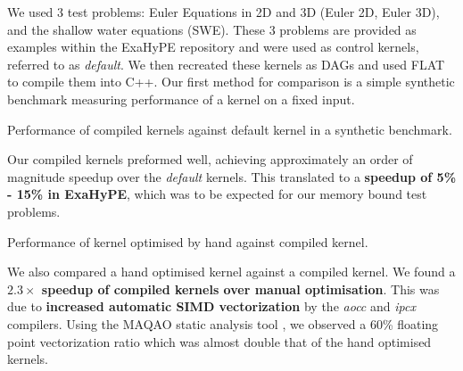 We used 3 test problems: Euler Equations in 2D and 3D (Euler 2D, Euler 3D), and the shallow water equations (SWE).
These 3 problems are provided as examples within the ExaHyPE repository and were used as control kernels, referred to as \textit{default}.
We then recreated these kernels as DAGs and used FLAT to compile them into C++.
Our first method for comparison is a simple synthetic benchmark measuring performance of a kernel on a fixed input.  

\begin{table}
    \centering
     
    \caption{Performance of compiled kernels against default kernel in a synthetic benchmark.} 
\end{table}

Our compiled kernels preformed well, achieving approximately an order of magnitude speedup over the \textit{default} kernels.
This translated to a \textbf{speedup of 5\% - 15\% in ExaHyPE}, which was to be expected for our memory bound test problems.


\begin{table}
    \centering
     
    \caption{Performance of kernel optimised by hand against compiled kernel.}
\end{table}
We also compared a hand optimised kernel against a compiled kernel. 
We found a \textbf{$2.3\times$ speedup of compiled kernels over manual optimisation}.
This was due to \textbf{increased automatic SIMD vectorization} by the \textit{aocc} and \textit{ipcx} compilers.
Using the MAQAO static analysis tool \cite{MAQAO}, we observed a 60\% floating point vectorization ratio which was almost double that of the hand optimised kernels.